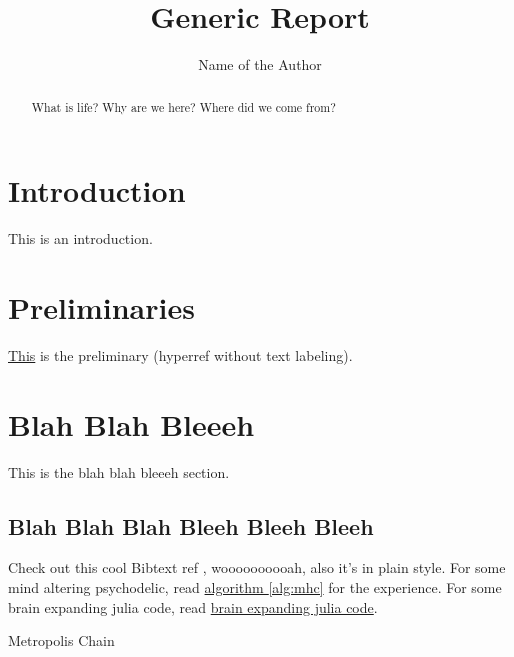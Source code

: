 \documentclass[]{article}
\title{Generic Report}
\author{Name of the Author}
\theoremstyle{definition}
\numberwithin{equation}{subsection}
\begin{document}
\maketitle

\begin{abstract}
    What is life? Why are we here? Where did we come from?
\end{abstract}


\section{Introduction}
    This is an introduction. 

\section{Preliminaries}\label{sec:preliminaries}
    \hyperref[sec:preliminaries]{This} is the preliminary (hyperref without text labeling). 
    
\section{Blah Blah Bleeeh}
    This is the blah blah bleeeh section. 
    \subsection{Blah Blah Blah Bleeh Bleeh Bleeh}
    Check out this cool Bibtext ref \cite[this]{texbook}, woooooooooah, also it's in plain style. For some mind altering psychodelic, read \hyperref[alg:mhc]{algorithm \ref*{alg:mhc}} for the experience. For some brain expanding julia code, read \hyperref[code:brain_expand]{brain expanding julia code}. 
    \begin{algorithm}
        \begin{algorithmic}[t]
        \end{algorithmic}
        \caption{Metropolis Chain}
        \label{alg:mhc}
    \end{algorithm}
    \label{code:brain_expand}
    
    
\end{document}
